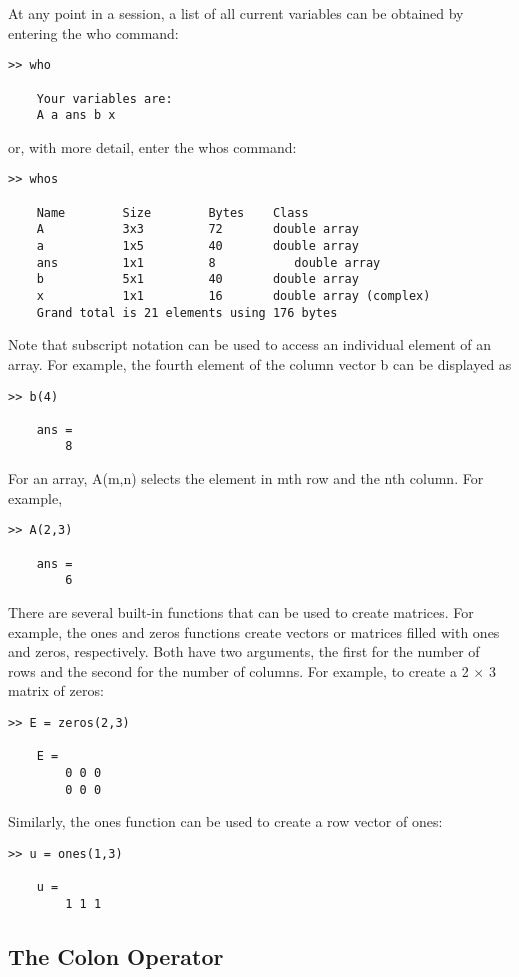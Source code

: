 \documentclass[../main.tex]{subfiles}
\begin{document}
At any point in a session, a list of all current variables can be obtained by entering the
who command:
\begin{lstlisting}[frame=none, numbers=none]
	>> who

	Your variables are:
	A a ans b x
\end{lstlisting}
or, with more detail, enter the whos command:
\begin{lstlisting}[frame=none, numbers=none]
	>> whos

	Name		Size 		Bytes	 Class
	A 			3x3 		72		 double array
	a 			1x5 		40		 double array
	ans 		1x1 		8		 	double array
	b 			5x1 		40		 double array
	x 			1x1 		16		 double array (complex)
	Grand total is 21 elements using 176 bytes
\end{lstlisting}
Note that subscript notation can be used to access an individual element of an array.
For example, the fourth element of the column vector b can be displayed as
\begin{lstlisting}[frame=none, numbers=none]
	>> b(4)

	ans =
		8
\end{lstlisting}
For an array, A(m,n) selects the element in mth row and the nth column. For example,
\begin{lstlisting}[frame=none, numbers=none]
	>> A(2,3)

	ans =
		6
\end{lstlisting}
There are several built-in functions that can be used to create matrices. For example,
the ones and zeros functions create vectors or matrices filled with ones and zeros,
respectively. Both have two arguments, the first for the number of rows and the second for
the number of columns. For example, to create a 2 $\times$  3 matrix of zeros:
\begin{lstlisting}[frame=none, numbers=none]
	>> E = zeros(2,3)

	E =
		0 0 0
		0 0 0
\end{lstlisting}
Similarly, the ones function can be used to create a row vector of ones:
\begin{lstlisting}[frame=none, numbers=none]
	>> u = ones(1,3)

	u =
		1 1 1
\end{lstlisting}

\subsection{The Colon Operator}\
\end{document}

